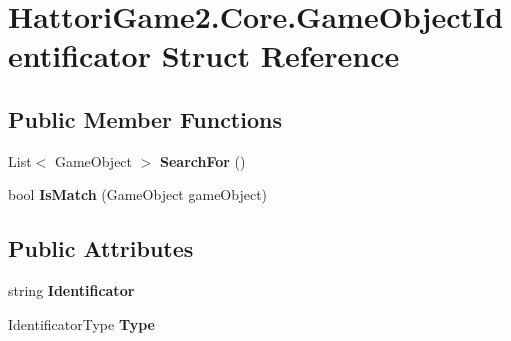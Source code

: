 \hypertarget{struct_hattori_game2_1_1_core_1_1_game_object_identificator}{}\section{Hattori\+Game2.\+Core.\+Game\+Object\+Identificator Struct Reference}
\label{struct_hattori_game2_1_1_core_1_1_game_object_identificator}
\subsection*{Public Member Functions}
\begin{DoxyCompactItemize}
\item 
\hypertarget{struct_hattori_game2_1_1_core_1_1_game_object_identificator_a418c958e88141611030934ec529239ef}{}List$<$ Game\+Object $>$ {\bfseries Search\+For} ()\label{struct_hattori_game2_1_1_core_1_1_game_object_identificator_a418c958e88141611030934ec529239ef}

\item 
\hypertarget{struct_hattori_game2_1_1_core_1_1_game_object_identificator_a83c0dd2fe2b4115c399b19ec1b02d66d}{}bool {\bfseries Is\+Match} (Game\+Object game\+Object)\label{struct_hattori_game2_1_1_core_1_1_game_object_identificator_a83c0dd2fe2b4115c399b19ec1b02d66d}

\end{DoxyCompactItemize}
\subsection*{Public Attributes}
\begin{DoxyCompactItemize}
\item 
\hypertarget{struct_hattori_game2_1_1_core_1_1_game_object_identificator_a9edc3e7e833038c8dad0c6dc4da3bed0}{}string {\bfseries Identificator}\label{struct_hattori_game2_1_1_core_1_1_game_object_identificator_a9edc3e7e833038c8dad0c6dc4da3bed0}

\item 
\hypertarget{struct_hattori_game2_1_1_core_1_1_game_object_identificator_abed6cf1fa2f801e6fb95b90c5d03c446}{}Identificator\+Type {\bfseries Type}\label{struct_hattori_game2_1_1_core_1_1_game_object_identificator_abed6cf1fa2f801e6fb95b90c5d03c446}

\end{DoxyCompactItemize}
